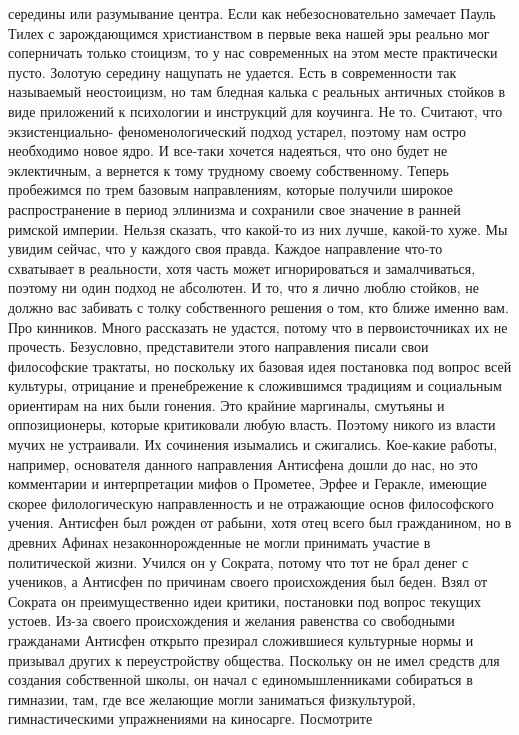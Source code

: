 середины или разумывание центра. Если как небезосновательно замечает Пауль Тилех
с зарождающимся христианством в первые века нашей эры реально мог соперничать
только стоицизм, то у нас современных на этом месте практически пусто. Золотую
середину нащупать не удается. Есть в современности так называемый неостоицизм,
но там бледная калька с реальных античных стойков в виде приложений к психологии
и инструкций для коучинга. Не то. Считают, что экзистенциально-
феноменологический подход устарел, поэтому нам остро необходимо новое ядро. И
все-таки хочется надеяться, что оно будет не эклектичным, а вернется к тому
трудному своему собственному. Теперь пробежимся по трем базовым направлениям,
которые получили широкое распространение в период эллинизма и сохранили свое
значение в ранней римской империи. Нельзя сказать, что какой-то из них лучше,
какой-то хуже. Мы увидим сейчас, что у каждого своя правда. Каждое направление
что-то схватывает в реальности, хотя часть может игнорироваться и замалчиваться,
поэтому ни один подход не абсолютен. И то, что я лично люблю стойков, не должно
вас забивать с толку собственного решения о том, кто ближе именно вам. Про
кинников. Много рассказать не удастся, потому что в первоисточниках их не
прочесть. Безусловно, представители этого направления писали свои философские
трактаты, но поскольку их базовая идея постановка под вопрос всей культуры,
отрицание и пренебрежение к сложившимся традициям и социальным ориентирам на них
были гонения. Это крайние маргиналы, смутьяны и оппозиционеры, которые
критиковали любую власть. Поэтому никого из власти мучих не устраивали. Их
сочинения изымались и сжигались. Кое-какие работы, например, основателя данного
направления Антисфена дошли до нас, но это комментарии и интерпретации мифов о
Прометее, Эрфее и Геракле, имеющие скорее филологическую направленность и не
отражающие основ философского учения. Антисфен был рожден от рабыни, хотя отец
всего был гражданином, но в древних Афинах незаконнорожденные не могли принимать
участие в политической жизни. Учился он у Сократа, потому что тот не брал денег
с учеников, а Антисфен по причинам своего происхождения был беден. Взял от
Сократа он преимущественно идеи критики, постановки под вопрос текущих устоев.
Из-за своего происхождения и желания равенства со свободными гражданами Антисфен
открыто презирал сложившиеся культурные нормы и призывал других к переустройству
общества. Поскольку он не имел средств для создания собственной школы, он начал
с единомышленниками собираться в гимназии, там, где все желающие могли
заниматься физкультурой, гимнастическими упражнениями на киносарге. Посмотрите
